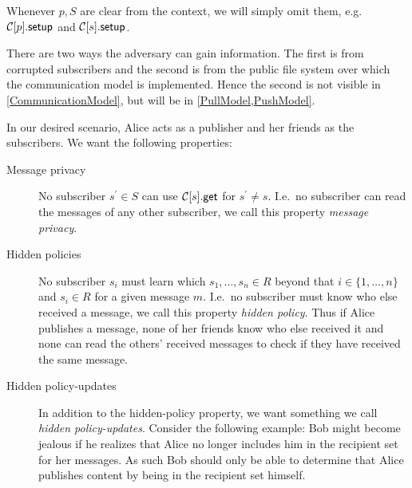 Whenever \(p, S\) are clear from the context, we will simply omit them, e.g.\ 
\(\csetup{p}\) and \(\csetup{s}\).

There are two ways the adversary can gain information.
The first is from corrupted subscribers and the second is from the public file 
system over which the communication model is implemented.
Hence the second is not visible in \cref{CommunicationModel}, but will be in 
\cref{PullModel,PushModel}.

In our desired scenario, Alice acts as a publisher and her friends as the 
subscribers.
We want the following properties:
\begin{description}
  \item[Message privacy]
    No subscriber \(s^\prime\in S\) can use \(\cget{s}\) for \(s^\prime\neq s\).
    I.e.\ no subscriber can read the messages of any other subscriber, we call 
    this property \emph{message privacy}.

  \item[Hidden policies]
    No subscriber \(s_i\) must learn which \(s_1, \ldots, s_n\in R\) beyond 
    that \(i\in \{1, \ldots, n\}\) and \(s_i\in R\) for a given message \(m\).
    I.e.\ no subscriber must know who else received a message, we call this 
    property \emph{hidden policy}.
    Thus if Alice publishes a message, none of her friends know who else 
    received it and none can read the others' received messages to check if 
    they have received the same message.


  \item[Hidden policy-updates]
    In addition to the hidden-policy property, we want something we call 
    \emph{hidden policy-updates}.
    Consider the following example:
    Bob might become jealous if he realizes that Alice no longer includes him 
    in the recipient set for her messages.
    As such Bob should only be able to determine that Alice publishes content 
    by being in the recipient set himself.
\end{description}


